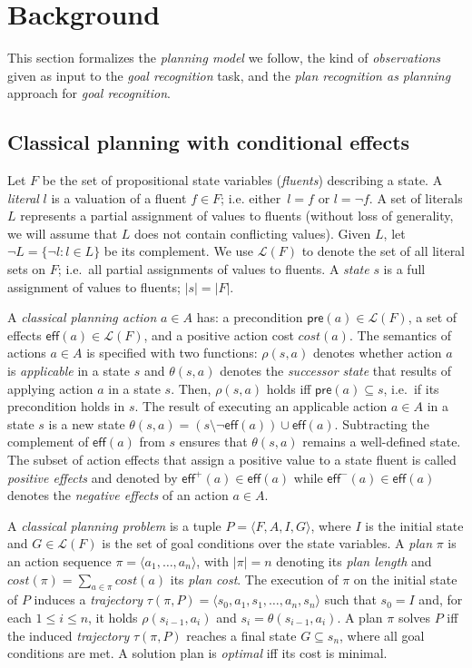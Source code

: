 \documentclass{article}
\newcommand{\tup}[1]{{\langle #1 \rangle}}
\newcommand{\pre}{\mathsf{pre}}     %
\newcommand{\eff}{\mathsf{eff}}     %
\begin{document}
\section{Background}
\label{sec:background}
This section formalizes the {\em planning model} we follow, the kind of {\em observations} given as input to the {\em goal recognition} task, and the {\em plan recognition as planning} approach for {\em goal recognition}.  

\subsection{Classical planning with conditional effects}
Let $F$ be the set of  propositional state variables ({\em fluents}) describing a state. A {\em literal} $l$ is a valuation of a fluent $f\in F$; i.e. either~$l=f$ or $l=\neg f$. A set of literals $L$ represents a partial assignment of values to fluents (without loss of generality, we will assume that $L$ does not contain conflicting values). Given $L$, let $\neg L=\{\neg l:l\in L\}$ be its complement. We use $\mathcal{L}(F)$ to denote the set of all literal sets on $F$; i.e.~all partial assignments of values to fluents. A {\em state} $s$ is a full assignment of values to fluents; $|s|=|F|$.

A {\em classical planning action} $a\in A$ has: a precondition $\pre(a)\in\mathcal{L}(F)$, a set of effects $\eff(a)\in\mathcal{L}(F)$, and a positive action cost $cost(a)$. The semantics of actions $a\in A$ is specified with two functions: $\rho(s,a)$ denotes whether action $a$ is {\em applicable} in a state $s$ and $\theta(s,a)$ denotes the {\em successor state} that results of applying action $a$ in a state $s$. Then, $\rho(s,a)$ holds iff $\pre(a)\subseteq s$, i.e.~if its precondition holds in $s$. The result of executing an applicable action $a\in A$ in a state $s$ is a new state $\theta(s,a)=(s\setminus \neg\eff(a))\cup\eff(a)$. Subtracting the complement of $\eff(a)$ from $s$ ensures that $\theta(s,a)$ remains a well-defined state. The subset of action effects that assign a positive value to a state fluent is called {\em positive effects} and denoted by $\eff^+(a)\in \eff(a)$ while $\eff^-(a)\in \eff(a)$ denotes the {\em negative effects} of an action $a\in A$.

A {\em classical planning problem} is a tuple $P=\tup{F,A,I,G}$, where $I$ is the initial state and $G\in\mathcal{L}(F)$ is the set of goal conditions over the state variables. A {\em plan} $\pi$ is an action sequence $\pi=\tup{a_1, \ldots, a_n}$, with $|\pi|=n$ denoting its {\em plan length} and $cost(\pi)=\sum_{a\in\pi} cost(a)$ its {\em plan cost}. The execution of $\pi$ on the initial state of $P$ induces a {\em trajectory} $\tau(\pi,P)=\tup{s_0, a_1, s_1, \ldots, a_n, s_n}$ such that $s_0=I$ and, for each {\small $1\leq i\leq n$}, it holds $\rho(s_{i-1},a_i)$ and $s_i=\theta(s_{i-1},a_i)$. A plan $\pi$ solves $P$ iff the induced {\em trajectory} $\tau(\pi,P)$ reaches a final state $G \subseteq s_n$, where all goal conditions are met. A solution plan is {\em optimal} iff its cost is minimal.
\end{document}
